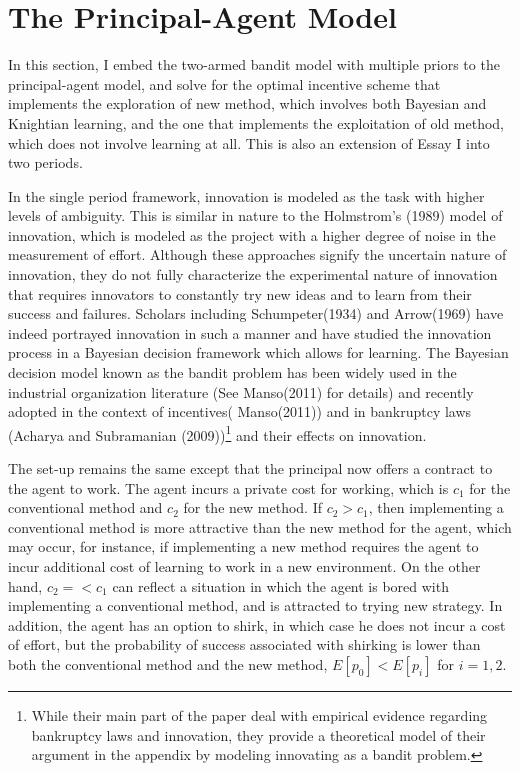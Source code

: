 \documentclass[11pt]{article} %
\theoremstyle{exampstyle}
\begin{document}
\section{The Principal-Agent Model}

In this section, I embed the two-armed bandit model with multiple priors to the principal-agent model, and solve for the optimal incentive scheme that implements the exploration of new method, which involves both Bayesian and Knightian learning, and the one that implements the exploitation of old method, which does not involve learning at all. This is also an extension of Essay I into two periods. 

In the single period framework, innovation is modeled as the task with higher levels of ambiguity. This is similar in nature to the Holmstrom's (1989) model of innovation, which is modeled as the project with a higher degree of noise in the measurement of effort. Although these approaches signify the uncertain nature of innovation, they do not fully characterize the experimental nature of innovation that requires innovators to constantly try new ideas and to learn from their success and failures. Scholars including Schumpeter(1934) and Arrow(1969) have indeed portrayed innovation in such a manner and have studied the innovation process in a Bayesian decision framework  which allows for learning. The Bayesian decision model known as the bandit problem has been widely used in the industrial organization literature (See Manso(2011) for details) and recently adopted in the context of incentives( Manso(2011)) and in bankruptcy laws (Acharya and Subramanian (2009))\footnote{While their main part of the paper deal with empirical evidence regarding bankruptcy laws and innovation, they provide a theoretical model of their argument in the appendix by modeling innovating as a bandit problem.} and their effects on innovation. 

The set-up remains the same except that the principal now offers a contract to the agent to work. The agent incurs a private cost for working, which is $ c_1 $ for the conventional method and $ c_2 $ for the new method. If $c_2>c_1$, then implementing a conventional method is more attractive than the new method for the agent, which may occur, for instance, if implementing a new method requires the agent to incur additional cost of learning to work in a new environment. On the other hand, $c_2=<c_1$ can reflect a situation in which the agent is bored with implementing a conventional method, and is attracted to trying new strategy. In addition, the agent has an option to shirk, in which case he does not incur a cost of effort, but the probability of success associated with shirking is lower than both the conventional method and the new method, $E[p_0]<E[p_i]$ for $i=1,2$.
\end{document}
